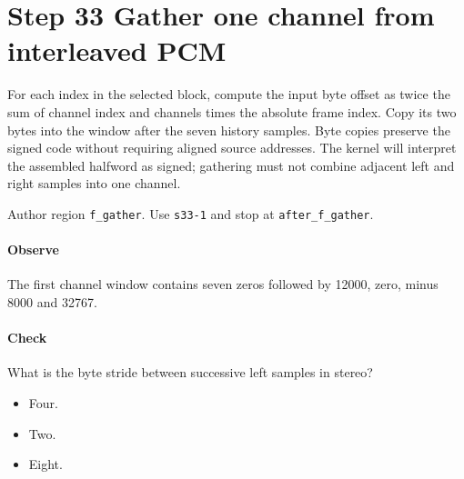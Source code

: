 \section{Step 33 Gather one channel from interleaved PCM}\label{pcm-wav-s33}
For each index in the selected block, compute the input byte offset as twice the sum of channel index and channels times the absolute frame index. Copy its two bytes into the window after the seven history samples. Byte copies preserve the signed code without requiring aligned source addresses. The kernel will interpret the assembled halfword as signed; gathering must not combine adjacent left and right samples into one channel.

Author region \texttt{f\_gather}. Use \texttt{s33-1} and stop at \texttt{after\_f\_gather}.

\paragraph{Observe} The first channel window contains seven zeros followed by 12000, zero, minus 8000 and 32767.

\paragraph{Check} What is the byte stride between successive left samples in stereo?
\begin{itemize}
  \item[A.] Four.
  \item[B.] Two.
  \item[C.] Eight.
\end{itemize}
